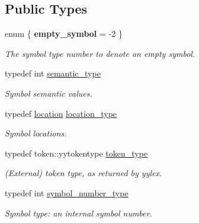 \subsection*{Public Types}
\begin{DoxyCompactItemize}
\item 
\mbox{\label{classyy_1_1parser_acd86822bc88edf119d2b33d1c08cec7d}} 
enum \{ {\bfseries empty\+\_\+symbol} = -\/2
 \}\begin{DoxyCompactList}\small\item\em The symbol type number to denote an empty symbol. \end{DoxyCompactList}
\item 
\mbox{\label{classyy_1_1parser_abb6ca82d9e84da6d4b98e65f650b2456}} 
typedef int \hyperlink{classyy_1_1parser_abb6ca82d9e84da6d4b98e65f650b2456}{semantic\+\_\+type}
\begin{DoxyCompactList}\small\item\em Symbol semantic values. \end{DoxyCompactList}\item 
\mbox{\label{classyy_1_1parser_a6cee0517f5ed9774dd68ee189b62e454}} 
typedef \hyperlink{classyy_1_1location}{location} \hyperlink{classyy_1_1parser_a6cee0517f5ed9774dd68ee189b62e454}{location\+\_\+type}
\begin{DoxyCompactList}\small\item\em Symbol locations. \end{DoxyCompactList}\item 
\mbox{\label{classyy_1_1parser_ac1ba3f834abfa251ea746c4ca8da5a85}} 
typedef token\+::yytokentype \hyperlink{classyy_1_1parser_ac1ba3f834abfa251ea746c4ca8da5a85}{token\+\_\+type}
\begin{DoxyCompactList}\small\item\em (External) token type, as returned by yylex. \end{DoxyCompactList}\item 
\mbox{\label{classyy_1_1parser_a522f5c6c3481d9285b0b991ac12292eb}} 
typedef int \hyperlink{classyy_1_1parser_a522f5c6c3481d9285b0b991ac12292eb}{symbol\+\_\+number\+\_\+type}
\begin{DoxyCompactList}\small\item\em Symbol type\+: an internal symbol number. \end{DoxyCompactList}\item 

\end{DoxyCompactItemize}
